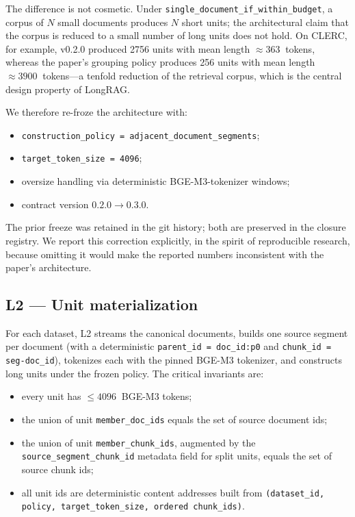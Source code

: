 \documentclass[11pt,a4paper]{article}
\begin{document}
The difference is not cosmetic. Under
\texttt{single\_document\_if\_within\_budget}, a corpus of $N$ small
documents produces $N$ short units; the architectural claim that the
corpus is reduced to a small number of long units does not hold. On
CLERC, for example, v0.2.0 produced \num{2756} units with mean
length $\approx \SI{363}{}$ tokens, whereas the paper's grouping
policy produces \num{256} units with mean length $\approx
\SI{3900}{}$ tokens---a tenfold reduction of the retrieval corpus,
which is the central design property of LongRAG.

We therefore re-froze the architecture with:

\begin{itemize}[leftmargin=1.5em,itemsep=0.15em]
  \item \texttt{construction\_policy = adjacent\_document\_segments};
  \item \texttt{target\_token\_size = 4096};
  \item oversize handling via deterministic BGE-M3-tokenizer windows;
  \item contract version $0.2.0 \to 0.3.0$.
\end{itemize}

The prior freeze was retained in the git history; both are preserved
in the closure registry. We report this correction explicitly, in
the spirit of reproducible research, because omitting it would make
the reported numbers inconsistent with the paper's architecture.

\subsection{L2 --- Unit materialization}
For each dataset, L2 streams the canonical documents, builds one
source segment per document (with a deterministic
\texttt{parent\_id = doc\_id:p0} and \texttt{chunk\_id = seg-doc\_id}),
tokenizes each with the pinned BGE-M3 tokenizer, and constructs
long units under the frozen policy. The critical invariants are:

\begin{itemize}[leftmargin=1.5em,itemsep=0.15em]
  \item every unit has $\leq \SI{4096}{}$ BGE-M3 tokens;
  \item the union of unit \texttt{member\_doc\_ids} equals the
    set of source document ids;
  \item the union of unit \texttt{member\_chunk\_ids}, augmented by
    the \texttt{source\_segment\_chunk\_id} metadata field for split
    units, equals the set of source chunk ids;
  \item all unit ids are deterministic content addresses built from
    \texttt{(dataset\_id, policy, target\_token\_size, ordered
    chunk\_ids)}.
\end{itemize}
\end{document}
